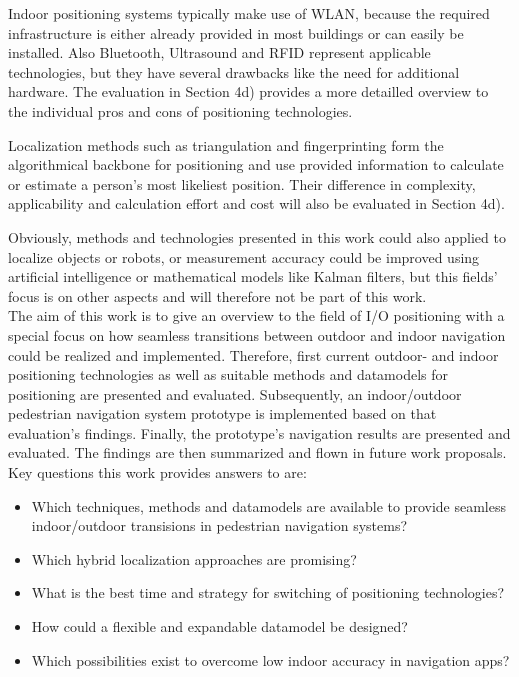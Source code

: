 Indoor positioning systems typically make use of WLAN, because the required infrastructure is either already provided in most buildings or can easily be installed. Also Bluetooth, Ultrasound and RFID represent applicable technologies, but they have several drawbacks like the need for additional hardware. The evaluation in Section 4d) provides a more detailled overview to the individual pros and cons of positioning technologies.

Localization methods such as triangulation and fingerprinting form the algorithmical backbone for positioning and use provided information to calculate or estimate a person's most likeliest position. Their difference in complexity, applicability and calculation effort and cost will also be evaluated in Section 4d).

Obviously, methods and technologies presented in this work could also applied to localize objects or robots, or measurement accuracy could be improved using artificial intelligence or mathematical models like Kalman filters, but this fields' focus is on other aspects and will therefore not be part of this work.\\

The aim of this work is to give an overview to the field of I/O positioning with a special focus on how seamless transitions between outdoor and indoor navigation could be realized and implemented. Therefore, first current outdoor- and indoor positioning technologies as well as suitable methods and datamodels for positioning are presented and evaluated. Subsequently, an indoor/outdoor pedestrian navigation system prototype is implemented based on that evaluation's findings.
Finally, the prototype's navigation results are presented and evaluated. The findings are then summarized and flown in future work proposals.\\


Key questions this work provides answers to are:
\begin{itemize}
	\item Which techniques, methods and datamodels are available to provide seamless indoor/outdoor transisions in pedestrian navigation systems?
	\item Which hybrid localization approaches are promising?
	\item What is the best time and strategy for switching of positioning technologies?
	\item How could a flexible and expandable datamodel be designed?
	\item Which possibilities exist to overcome low indoor accuracy in navigation apps?
\end{itemize}

